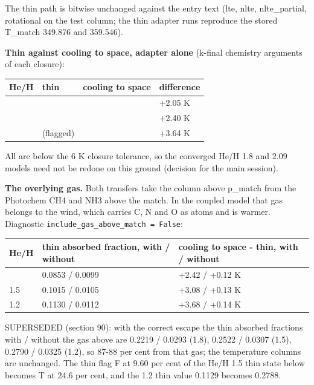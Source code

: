 \documentclass[english,a4paper]{my_memo}
\begin{document}
The thin path is bitwise unchanged against the entry text (lte, nlte,
nlte\_partial, rotational on the test column; the thin adapter runs
reproduce the stored T\_match 349.876 and 359.546).

\textbf{Thin against cooling to space, adapter alone} (k-final chemistry
arguments of each closure):

{\def\LTcaptype{none} %
{\small
\begin{longtable}[]{@{}>{\raggedright\arraybackslash}p{\dimexpr(\linewidth-8\tabcolsep)/4\relax}>{\raggedright\arraybackslash}p{\dimexpr(\linewidth-8\tabcolsep)/4\relax}>{\raggedright\arraybackslash}p{\dimexpr(\linewidth-8\tabcolsep)/4\relax}>{\raggedright\arraybackslash}p{\dimexpr(\linewidth-8\tabcolsep)/4\relax}@{}}
\toprule\noalign{}
He/H & thin & cooling to space & difference \\
\midrule\noalign{}
\endhead
\bottomrule\noalign{}
\endlastfoot
2.09 & 349.876 & 351.922 & +2.05 K \\
1.8 & 359.546 & 361.949 & +2.40 K \\
1.2 & 382.735 (flagged) & 386.371 & +3.64 K \\
\end{longtable}
}
}

All are below the 6 K closure tolerance, so the converged He/H 1.8 and
2.09 models need not be redone on this ground (decision for the main
session).

\textbf{The overlying gas.} Both transfers take the column above p\_match from
the Photochem CH4 and NH3 above the match. In the coupled model that gas
belongs to the wind, which carries C, N and O as atoms and is warmer.
Diagnostic \texttt{include\_gas\_above\_match\ =\ False}:

{\def\LTcaptype{none} %
{\small
\begin{longtable}[]{@{}lll@{}}
\toprule\noalign{}
He/H & thin absorbed fraction, with / without & cooling to space - thin, with / without \\
\midrule\noalign{}
\endhead
\bottomrule\noalign{}
\endlastfoot
1.8 & 0.0853 / 0.0099 & +2.42 / +0.12 K \\
1.5 & 0.1015 / 0.0105 & +3.08 / +0.13 K \\
1.2 & 0.1130 / 0.0112 & +3.68 / +0.14 K \\
\end{longtable}
}
}

SUPERSEDED (section 90): with the correct escape the thin absorbed
fractions with / without the gas above are 0.2219 / 0.0293 (1.8), 0.2522 /
0.0307 (1.5), 0.2790 / 0.0325 (1.2), so 87-88 per cent from that gas; the
temperature columns are unchanged. The thin flag F at 9.60 per cent of the
He/H 1.5 thin state below becomes T at 24.6 per cent, and the 1.2 thin
value 0.1129 becomes 0.2788.
\end{document}
